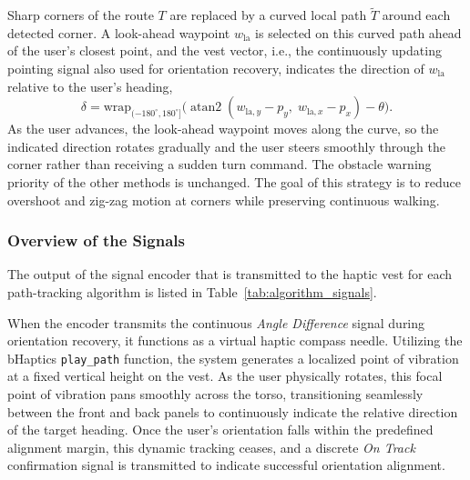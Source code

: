 \documentclass[12pt]{report}
\begin{document}
Sharp corners of the route $T$ are replaced by a curved local path $\tilde{T}$ around each detected corner. A look-ahead waypoint $w_{\text{la}}$ is selected on this curved path ahead of the user's closest point, and the vest vector, i.e., the continuously updating pointing signal also used for orientation recovery, indicates the direction of $w_{\text{la}}$ relative to the user's heading,
\[
\delta=\mathrm{wrap}_{(-180^\circ,180^\circ]}\!\bigl(\operatorname{atan2}(w_{\text{la},y}-p_y,\;w_{\text{la},x}-p_x)-\theta\bigr).
\]
As the user advances, the look-ahead waypoint moves along the curve, so the indicated direction rotates gradually and the user steers smoothly through the corner rather than receiving a sudden turn command. The obstacle warning priority of the other methods is unchanged. The goal of this strategy is to reduce overshoot and zig-zag motion at corners while preserving continuous walking.

\subsubsection*{Overview of the Signals}
The output of the signal encoder that is transmitted to the haptic vest for each path-tracking algorithm is listed in Table~\ref{tab:algorithm_signals}.

When the encoder transmits the continuous \textit{Angle Difference} signal during orientation recovery, it functions as a virtual haptic compass needle. Utilizing the bHaptics \texttt{play\_path} function, the system generates a localized point of vibration at a fixed vertical height on the vest. As the user physically rotates, this focal point of vibration pans smoothly across the torso, transitioning seamlessly between the front and back panels to continuously indicate the relative direction of the target heading. Once the user's orientation falls within the predefined alignment margin, this dynamic tracking ceases, and a discrete \textit{On Track} confirmation signal is transmitted to indicate successful orientation alignment.
\end{document}
